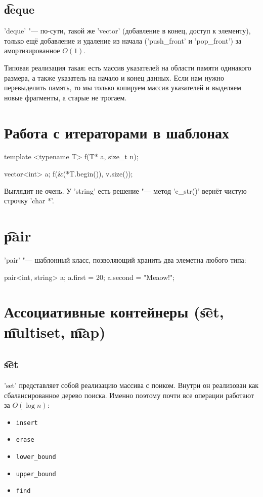 \subsection{\t{deque}}
\cpp'deque' "--- по-сути, такой же \cpp'vector' (добавление в конец, доступ к элементу), только ещё добавление и удаление из начала
(\cpp'push_front' и \cpp'pop_front') за амортизированное $O(1)$.

Типовая реализация такая: есть массив указателей на области памяти одинакого размера, а также указатель на начало и конец данных.
Если нам нужно перевыделить память, то мы только копируем массив указателей и выделяем новые фрагменты, а старые не трогаем.

\section{Работа с итераторами в шаблонах}

\begin{cppcode}
template <typename T>
f(T* a, size_t n);

vector<int> a;
f(&(*T.begin()), v.size());
\end{cppcode}

Выглядит не очень. У \cpp'string' есть решение "--- метод \cpp'c_str()' вернёт чистую строчку \cpp'char *'.

\section{\t{pair}}
\cpp'pair' "--- шаблонный класс, позволяющий хранить два элеметна любого типа:
\begin{cppcode}
pair<int, string> a;
a.first = 20;
a.second = "Meaow!";
\end{cppcode}

\section{Ассоциативные контейнеры (\t{set}, \t{multiset}, \t{map})}

\subsection{\t{set}}
\cpp'set' представляет собой реализацию массива с поиком.
Внутри он реализован как сбалансированное дерево поиска.
Именно поэтому почти все операции работают за $O(\log n)$:
\begin{itemize}
	\item \verb'insert'
	\item \verb'erase'
	\item \verb'lower_bound'
	\item \verb'upper_bound'
	\item \verb'find'
\end{itemize}

